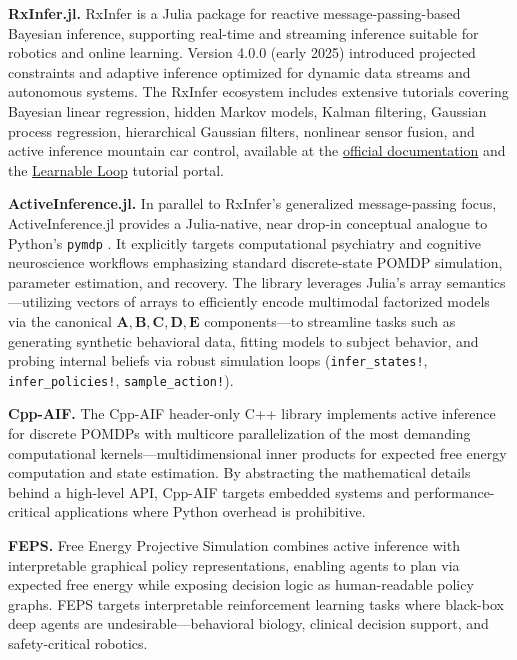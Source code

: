 \documentclass[
  english,
]{article}
\begin{document}
{{{{{{{{{{{{{{{{\textbf{RxInfer.jl.} RxInfer is a Julia package for reactive
message-passing-based Bayesian inference, supporting real-time and
streaming inference suitable for robotics and online learning. Version
4.0.0 (early 2025) \citep{rxinfer2025} introduced projected constraints
and adaptive inference optimized for dynamic data streams and autonomous
systems. The RxInfer ecosystem includes extensive tutorials covering
Bayesian linear regression, hidden Markov models, Kalman filtering,
Gaussian process regression, hierarchical Gaussian filters, nonlinear
sensor fusion, and active inference mountain car control, available at
the \href{https://reactivebayes.github.io/RxInfer.jl/stable/}{official
documentation} and the \href{https://learnableloop.com/}{Learnable Loop}
tutorial portal.

\textbf{ActiveInference.jl.} In parallel to RxInfer's generalized
message-passing focus, ActiveInference.jl provides a Julia-native, near
drop-in conceptual analogue to Python's \texttt{pymdp}
\citep{ActiveInferencejl}. It explicitly targets computational
psychiatry and cognitive neuroscience workflows emphasizing standard
discrete-state POMDP simulation, parameter estimation, and recovery. The
library leverages Julia's array semantics---utilizing vectors of arrays
to efficiently encode multimodal factorized models via the canonical
\(\mathbf{A}, \mathbf{B}, \mathbf{C}, \mathbf{D}, \mathbf{E}\)
components---to streamline tasks such as generating synthetic behavioral
data, fitting models to subject behavior, and probing internal beliefs
via robust simulation loops (\texttt{infer\_states!},
\texttt{infer\_policies!}, \texttt{sample\_action!}).

\textbf{Cpp-AIF.} The Cpp-AIF header-only C++ library
\citep{gregoretti2023cppaif} implements active inference for discrete
POMDPs with multicore parallelization of the most demanding
computational kernels---multidimensional inner products for expected
free energy computation and state estimation. By abstracting the
mathematical details behind a high-level API, Cpp-AIF targets embedded
systems and performance-critical applications where Python overhead is
prohibitive.

\textbf{FEPS.} Free Energy Projective Simulation \citep{pazem2024feps}
combines active inference with interpretable graphical policy
representations, enabling agents to plan via expected free energy while
exposing decision logic as human-readable policy graphs. FEPS targets
interpretable reinforcement learning tasks where black-box deep agents
are undesirable---behavioral biology, clinical decision support, and
safety-critical robotics.

}}}}}}}}}}}}}}}}
\end{document}
